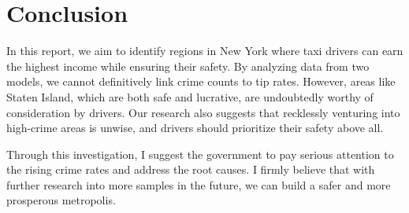 \documentclass[11pt]{article}
\begin{document}
\section{Conclusion}
In this report, we aim to identify regions in New York where taxi drivers can earn the highest income while ensuring their safety. By analyzing data from two models, we cannot definitively link crime counts to tip rates. However, areas like Staten Island, which are both safe and lucrative, are undoubtedly worthy of consideration by drivers. Our research also suggests that recklessly venturing into high-crime areas is unwise, and drivers should prioritize their safety above all.

Through this investigation, I suggest the government to pay serious attention to the rising crime rates and address the root causes. I firmly believe that with further research into more samples in the future, we can build a safer and more prosperous metropolis.
\clearpage


\printbibliography
\end{document}
